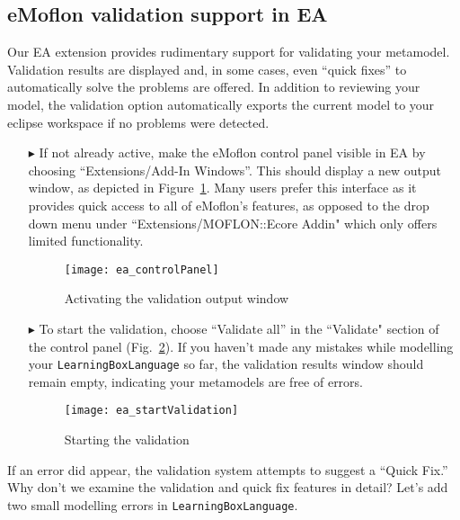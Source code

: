 \newpage
\genHeader
\hypertarget{validation vis}{} 
\subsection{eMoflon validation support in EA}

Our EA extension provides rudimentary support for validating your metamodel. Validation results are displayed and, in some cases, even ``quick fixes'' to
automatically solve the problems are offered. In addition to reviewing your model, the validation option automatically exports the current model to your eclipse
workspace if no problems were detected.

\begin{enumerate}
\item[$\blacktriangleright$] If not already active, make the eMoflon control panel visible in EA by choosing ``Extensions/\-Add-In Windows''. This should
display a new output window, as depicted in Figure~\ref{ea:validation_output}.
Many users prefer this interface as it provides quick access to all of eMoflon's features, as opposed to the drop down menu under ``Extensions/MOFLON::Ecore Addin" which only offers limited functionality.

\begin{figure}[htbp]
	\centering
  \texttt{[image: ea\_controlPanel]}
	\caption{Activating the validation output window}
	\label{ea:validation_output}
\end{figure}
\FloatBarrier

\clearpage
\item[$\blacktriangleright$] To start the validation, choose ``Validate all'' in the ``Validate" section of the control panel
(Fig.~\ref{ea:validation_menu}). If you haven't made any mistakes while modelling your \texttt{LearningBoxLanguage} so far, the validation results window
should remain empty, indicating your metamodels are free of errors.

\begin{figure}[htbp]
	\centering
  \texttt{[image: ea\_startValidation]}
	\caption{Starting the validation}
	\label{ea:validation_menu}
\end{figure}
\FloatBarrier
\end{enumerate}

If an error did appear, the validation system attempts to suggest a ``Quick Fix.'' Why don't we examine the validation and quick fix features in detail? Let's
add two small modelling errors in \texttt{LearningBoxLanguage}.

